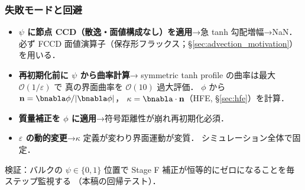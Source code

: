 \subsubsection{失敗モードと回避}
\label{sec:cls_failure_modes}

\begin{itemize}
  \item \textbf{$\psi$ に節点 CCD（散逸・面値構成なし）を適用}→急 tanh 勾配増幅→NaN．
        必ず FCCD 面値演算子（保存形フラックス；\S\ref{sec:advection_motivation}）を用いる．
  \item \textbf{再初期化前に $\psi$ から曲率計算}→
        symmetric tanh profile の曲率は最大 $\mathcal{O}(1/\varepsilon)$ で
        真の界面曲率を $\mathcal{O}(10)$ 過大評価．
        $\phi$ から $\mathbf{n}=\bnabla\phi/|\bnabla\phi|$，
        $\kappa=\bnabla\cdot\mathbf{n}$（HFE, \S\ref{sec:hfe}）を計算．
  \item \textbf{質量補正を $\phi$ に適用}→符号距離性が崩れ再初期化必須．
  \item \textbf{$\varepsilon$ の動的変更}→$\kappa$ 定義が変わり界面運動が変質．
        シミュレーション全体で固定．
\end{itemize}

\noindent 検証：バルクの $\psi\in\{0,1\}$ 位置で
Stage F 補正が恒等的にゼロになることを毎ステップ監視する
（本稿の回帰テスト）．

